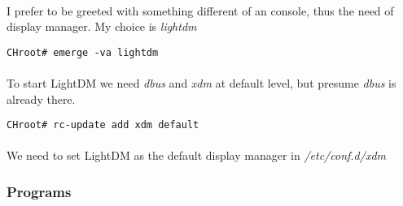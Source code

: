 \documentclass[10pt,a4paper]{article}
\begin{document}
                    \paragraph{} I prefer to be greeted with something different of an console, thus the need of display manager. My choice is \textit{lightdm} 
                    
                    \begin{lstlisting}[style=BashInputCHRoot]
 CHroot# emerge -va lightdm
                    \end{lstlisting}
                    
                    \paragraph{} To start LightDM we need \textit{dbus} and \textit{xdm} at default level, but presume \textit{dbus} is already there.
                    
                    \begin{lstlisting}[style=BashInputCHRoot]
 CHroot# rc-update add xdm default
                    \end{lstlisting}
                    
                    \paragraph{} We need to set LightDM as the default display manager in \textit{/etc/conf.d/xdm}
                    
                    
                
                \newpage
                \subsubsection{Programs}
\end{document}
